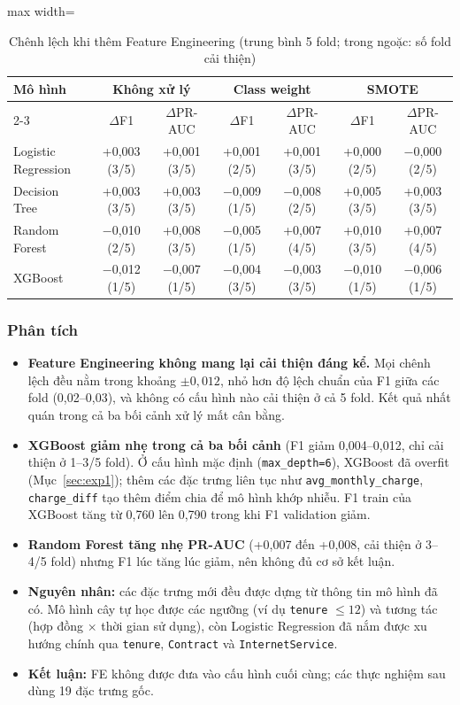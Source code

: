 \begin{table}[H]
\centering
\small
\begin{adjustbox}{max width=\textwidth}
\begin{tabular}{|l|c|c|c|c|c|c|}
\hline
\multirow{2}{*}{\textbf{Mô hình}} & \multicolumn{2}{c|}{\textbf{Không xử lý}} & \multicolumn{2}{c|}{\textbf{Class weight}} & \multicolumn{2}{c|}{\textbf{SMOTE}} \\
\cline{2-3} \cline{4-5} \cline{6-7}
 & $\Delta$F1 & $\Delta$PR-AUC & $\Delta$F1 & $\Delta$PR-AUC & $\Delta$F1 & $\Delta$PR-AUC \\
\hline
Logistic Regression & +0,003 (3/5) & +0,001 (3/5) & +0,001 (2/5) & +0,001 (3/5) & +0,000 (2/5) & $-$0,000 (2/5) \\
\hline
Decision Tree & +0,003 (3/5) & +0,003 (3/5) & $-$0,009 (1/5) & $-$0,008 (2/5) & +0,005 (3/5) & +0,003 (3/5) \\
\hline
Random Forest & $-$0,010 (2/5) & +0,008 (3/5) & $-$0,005 (1/5) & +0,007 (4/5) & +0,010 (3/5) & +0,007 (4/5) \\
\hline
XGBoost & $-$0,012 (1/5) & $-$0,007 (1/5) & $-$0,004 (3/5) & $-$0,003 (3/5) & $-$0,010 (1/5) & $-$0,006 (1/5) \\
\hline
\end{tabular}
\end{adjustbox}
\caption{Chênh lệch khi thêm Feature Engineering (trung bình 5 fold; trong ngoặc: số fold cải thiện)}
\label{tab:fe}
\end{table}

\subsubsection{Phân tích}
\begin{itemize}
    \item \textbf{Feature Engineering không mang lại cải thiện đáng kể.} Mọi chênh lệch đều nằm trong khoảng $\pm 0{,}012$, nhỏ hơn độ lệch chuẩn của F1 giữa các fold (0,02--0,03), và không có cấu hình nào cải thiện ở cả 5 fold. Kết quả nhất quán trong cả ba bối cảnh xử lý mất cân bằng.
    \item \textbf{XGBoost giảm nhẹ trong cả ba bối cảnh} (F1 giảm 0,004--0,012, chỉ cải thiện ở 1--3/5 fold). Ở cấu hình mặc định (\texttt{max\_depth=6}), XGBoost đã overfit (Mục~\ref{sec:exp1}); thêm các đặc trưng liên tục như \texttt{avg\_monthly\_charge}, \texttt{charge\_diff} tạo thêm điểm chia để mô hình khớp nhiễu. F1 train của XGBoost tăng từ 0,760 lên 0,790 trong khi F1 validation giảm.
    \item \textbf{Random Forest tăng nhẹ PR-AUC} (+0,007 đến +0,008, cải thiện ở 3--4/5 fold) nhưng F1 lúc tăng lúc giảm, nên không đủ cơ sở kết luận.
    \item \textbf{Nguyên nhân:} các đặc trưng mới đều được dựng từ thông tin mô hình đã có. Mô hình cây tự học được các ngưỡng (ví dụ \texttt{tenure} $\le 12$) và tương tác (hợp đồng $\times$ thời gian sử dụng), còn Logistic Regression đã nắm được xu hướng chính qua \texttt{tenure}, \texttt{Contract} và \texttt{InternetService}.
    \item \textbf{Kết luận:} FE không được đưa vào cấu hình cuối cùng; các thực nghiệm sau dùng 19 đặc trưng gốc.
\end{itemize}

